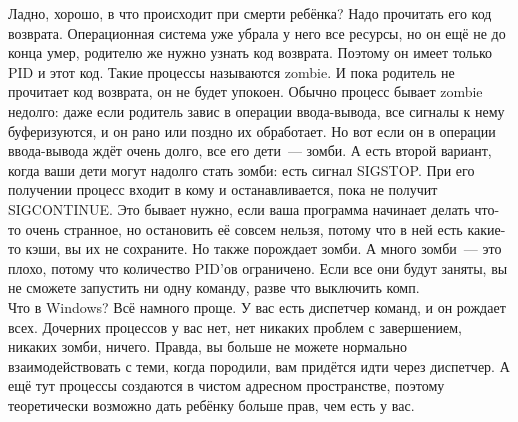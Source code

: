 \documentclass{article}
\begin{document}
    Ладно, хорошо, в что происходит при смерти ребёнка? Надо прочитать его код возврата. Операционная система уже убрала у него все ресурсы, но он ещё не до конца умер, родителю же нужно узнать код возврата. Поэтому он имеет только PID и этот код. Такие процессы называются zombie. И пока родитель не прочитает код возврата, он не будет упокоен. Обычно процесс бывает zombie недолго: даже если родитель завис в операции ввода-вывода, все сигналы к нему буферизуются, и он рано или поздно их обработает. Но вот если он в операции ввода-вывода ждёт очень долго, все его дети~--- зомби. А есть второй вариант, когда ваши дети могут надолго стать зомби: есть сигнал SIGSTOP. При его получении процесс входит в кому и останавливается, пока не получит SIGCONTINUE. Это бывает нужно, если ваша программа начинает делать что-то очень странное, но остановить её совсем нельзя, потому что в ней есть какие-то кэши, вы их не сохраните. Но также порождает зомби. А много зомби~--- это плохо, потому что количество PID'ов ограничено. Если все они будут заняты, вы не сможете запустить ни одну команду, разве что выключить комп.\\
    Что в Windows? Всё намного проще. У вас есть диспетчер команд, и он рождает всех. Дочерних процессов у вас нет, нет никаких проблем с завершением, никаких зомби, ничего. Правда, вы больше не можете нормально взаимодействовать с теми, когда породили, вам придётся идти через диспетчер. А ещё тут процессы создаются в чистом адресном пространстве, поэтому теоретически возможно дать ребёнку больше прав, чем есть у вас.
\end{document}

